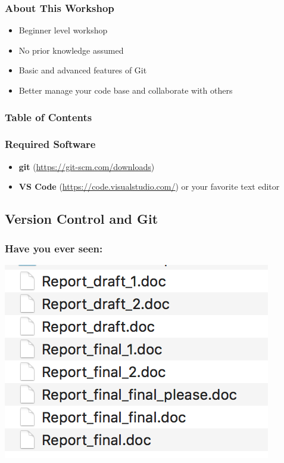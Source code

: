 \documentclass[12pt]{beamer}
\begin{document}
\begin{frame}
\frametitle{About This Workshop}
\begin{itemize}
	\item Beginner level workshop
	\item No prior knowledge assumed
	\item Basic and advanced features of Git
	\item Better manage your code base and collaborate with others
\end{itemize}
\end{frame}

\begin{frame}
\frametitle{Table of Contents}
\tableofcontents
\end{frame}

\begin{frame}
\frametitle{Required Software}
\begin{itemize}
	\item \textbf{git} (\url{https://git-scm.com/downloads})
	\item \textbf{VS Code} (\url{https://code.visualstudio.com/}) or your favorite text editor
\end{itemize}
\end{frame}


\subsection{Version Control and Git}
\begin{frame}
\frametitle{Have you ever seen:}
\begin{center}	
	\includegraphics[width=0.5\linewidth]{bad_example}
\end{center}
\end{frame}
\end{document}
